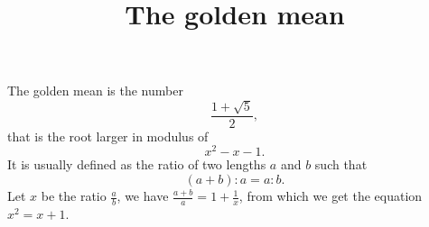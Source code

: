 \documentclass[a4paper,11pt]{article}
\title{The golden mean}
\author{}
\date{}
\begin{document}
\maketitle

The golden mean is the number
\[\frac{1 + \sqrt{5}}{2},\] 
that is the root larger in modulus of
\begin{equation} x^2 - x - 1. \end{equation}
It is usually defined as the ratio of two lengths \(a\) and \(b\) such that 
\begin{equation*} (a+b) : a = a : b. \end{equation*} 
Let \(x\) be the ratio \( \frac{a}{b} \), we have \( \frac{a+b}{a} = 1 + \frac{1}{x} \), from which we get the equation \(x^2 = x + 1\).
\end{document}
